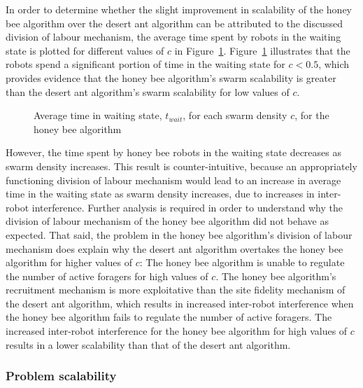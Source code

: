 \documentclass[preprint,12pt]{elsarticle}
\begin{document}
In order to determine whether the slight improvement in scalability of the honey bee algorithm over the desert ant algorithm can be attributed to the discussed division of labour mechanism, the average time spent by robots in the waiting state is plotted for different values of $c$ in Figure~\ref{fig:swarmscalabilitywaitingtime}. Figure~\ref{fig:swarmscalabilitywaitingtime} illustrates that the robots spend a significant portion of time in the waiting state for $c < 0.5$, which provides evidence that the honey bee algorithm's swarm scalability is greater than the desert ant algorithm's swarm scalability for low values of $c$.

\begin{figure}[htb]
\centering
\small
\resizebox{\textwidth}{!}{}
\caption{Average time in waiting state, $t_{wait}$, for each swarm density $c$, for the honey bee algorithm}
\label{fig:swarmscalabilitywaitingtime}
\end{figure}
However, the time spent by honey bee robots in the waiting state decreases as swarm density increases. This result is counter-intuitive, because an appropriately functioning division of labour mechanism would lead to an increase in average time in the waiting state as swarm density increases, due to increases in inter-robot interference. Further analysis is required in order to understand why the division of labour mechanism of the honey bee algorithm did not behave as expected. That said, the problem in the honey bee algorithm's division of labour mechanism does explain why the desert ant algorithm overtakes the honey bee algorithm for higher values of $c$: The honey bee algorithm is unable to regulate the number of active foragers for high values of $c$. The honey bee algorithm's recruitment mechanism is more exploitative than the site fidelity mechanism of the desert ant algorithm, which results in increased inter-robot interference when the honey bee algorithm fails to regulate the number of active foragers. The increased inter-robot interference for the honey bee algorithm for high values of $c$ results in a lower scalability than that of the desert ant algorithm.

\subsubsection{Problem scalability}
\label{results:problemscalability}
\end{document}
